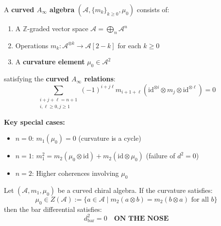 \begin{definition}\label{def:curved-ainfty-complete}
A \textbf{curved $A_\infty$ algebra} $(\mathcal{A}, \{m_k\}_{k \geq 0}, \mu_0)$ consists of:
\begin{enumerate}
\item A $\mathbb{Z}$-graded vector space $\mathcal{A} = \bigoplus_{n} \mathcal{A}^n$
\item Operations $m_k: \mathcal{A}^{\otimes k} \to \mathcal{A}[2-k]$ for each $k \geq 0$
\item A \textbf{curvature element} $\mu_0 \in \mathcal{A}^2$
\end{enumerate}
satisfying the \textbf{curved $A_\infty$ relations}:
\begin{equation}\label{eq:curved-ainfty-relations}
\sum_{\substack{i+j+\ell=n+1 \\ i,\ell \geq 0, j \geq 1}} (-1)^{i+j\ell} m_{i+1+\ell}
(\text{id}^{\otimes i} \otimes m_j \otimes \text{id}^{\otimes \ell}) = 0
\end{equation}

\textbf{Key special cases:}
\begin{itemize}
\item $n = 0$: $m_1(\mu_0) = 0$ \quad (curvature is a cycle)
\item $n = 1$: $m_1^2 = m_2(\mu_0 \otimes \text{id}) + m_2(\text{id} \otimes \mu_0)$ 
\quad (failure of $d^2 = 0$)
\item $n = 2$: Higher coherences involving $\mu_0$
\end{itemize}
\end{definition}

\begin{theorem}\label{thm:central-implies-strict}
Let $(\mathcal{A}, m_1, \mu_0)$ be a curved chiral algebra. If the curvature satisfies:
\begin{equation}
\mu_0 \in Z(\mathcal{A}) := \{a \in \mathcal{A} \mid m_2(a \otimes b) = m_2(b \otimes a) 
\text{ for all } b\}
\end{equation}
then the bar differential satisfies:
\begin{equation}
d_{\text{bar}}^2 = 0 \quad \textbf{ON THE NOSE}
\end{equation}
\end{theorem}

